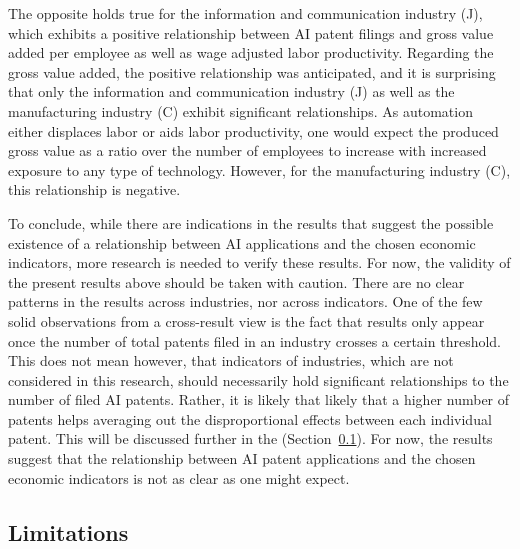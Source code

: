 \documentclass[
  12pt,
  a4paperpaper,
]{article}
\begin{document}
The opposite holds true for the information and communication industry
(J), which exhibits a positive relationship between AI patent filings
and gross value added per employee as well as wage adjusted labor
productivity. Regarding the gross value added, the positive relationship
was anticipated, and it is surprising that only the information and
communication industry (J) as well as the manufacturing industry (C)
exhibit significant relationships. As automation either displaces labor
or aids labor productivity, one would expect the produced gross value as
a ratio over the number of employees to increase with increased exposure
to any type of technology. However, for the manufacturing industry (C),
this relationship is negative.

To conclude, while there are indications in the results that suggest the
possible existence of a relationship between AI applications and the
chosen economic indicators, more research is needed to verify these
results. For now, the validity of the present results above should be
taken with caution. There are no clear patterns in the results across
industries, nor across indicators. One of the few solid observations
from a cross-result view is the fact that results only appear once the
number of total patents filed in an industry crosses a certain
threshold. This does not mean however, that indicators of industries,
which are not considered in this research, should necessarily hold
significant relationships to the number of filed AI patents. Rather, it
is likely that likely that a higher number of patents helps averaging
out the disproportional effects between each individual patent. This
will be discussed further in the 
(Section~\ref{sec-limitations}). For now, the results suggest that the
relationship between AI patent applications and the chosen economic
indicators is not as clear as one might expect.

\subsection{Limitations}\label{sec-limitations}
\end{document}
